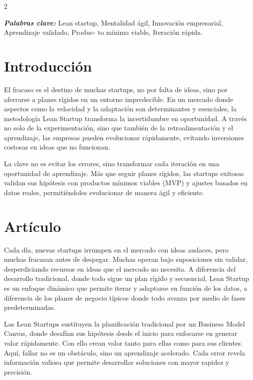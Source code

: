 \documentclass[12pt,spanish,Letterpaper,openany]{book}
\begin{document}
\begin {multicols}{2}

\textbf{\emph{Palabras clave:}} Lean startup, Mentalidad ágil, Innovación empresarial, Aprendizaje validado, Produc-
to mínimo viable, Iteración rápida.

\hypertarget{introducciuxf3n-1}{%
\section{Introducción}\label{introducciuxf3n-1}}

El fracaso es el destino de muchas startups, no por falta de ideas, sino por aferrarse a planes rígidos en un entorno impredecible. En un mercado donde aspectos como la velocidad y la adaptación son determinantes y esenciales, la metodología Lean Startup transforma la incertidumbre en oportunidad. A través no solo de la experimentación, sino que también de la retroalimentación y el aprendizaje, las empresas pueden evolucionar rápidamente, evitando inversiones costosas en ideas que no funcionan.

La clave no es evitar los errores, sino transformar cada iteración en una oportunidad de aprendizaje. Más que seguir planes rígidos, las startups exitosas validan sus hipótesis con productos mínimos viables (MVP) y ajustes basados en datos reales, permitiéndoles
evolucionar de manera ágil y eficiente.

\hypertarget{artuxedculo-1}{%
\section{Artículo}\label{artuxedculo-1}}

Cada día, nuevas startups irrumpen en el mercado con ideas audaces, pero muchas fracasan antes de despegar. Muchas operan bajo suposiciones sin validar, desperdiciando recursos en ideas que el mercado no necesita. A diferencia del desarrollo tradicional, donde todo sigue un plan rígido y secuencial, Lean Startup es un enfoque dinámico que permite iterar y adaptarse en función de los datos, a diferencia de los planes de negocio típicos donde todo avanza por medio de fases predeterminadas.

Las Lean Startups sustituyen la planificación tradicional por un Business Model Canvas, donde desafían sus hipótesis desde el inicio para enfocarse en generar valor rápidamente. Con ello crean valor tanto para ellas como para sus clientes. Aquí, fallar no es un obstáculo, sino un aprendizaje acelerado. Cada error revela información valiosa que permite desarrollar soluciones con mayor rapidez y precisión.


\end{multicols}
\end{document}
